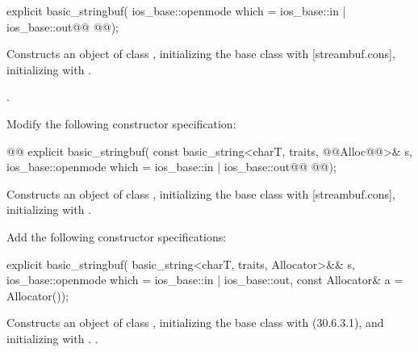 \documentclass[ebook,11pt,article]{memoir}
\renewcommand{\iref}[1]{[#1]}
\begin{document}
\begin{itemdecl}
explicit basic_stringbuf(
  ios_base::openmode which = ios_base::in | ios_base::out@\added{,}@
  @@);
\end{itemdecl}

\begin{itemdescr}
\pnum
\effects
Constructs an object of class
,
initializing the base class with
\iref{streambuf.cons},  initializing
with .

\pnum
\ensures
{}.
\end{itemdescr}

Modify the following constructor specification:
\begin{itemdecl}
@@
explicit basic_stringbuf(
  const basic_string<charT, traits, @@Alloc@@>& s,
  ios_base::openmode which = ios_base::in | ios_base::out@\added{,}@
  @@);
\end{itemdecl}

\begin{itemdescr}
\pnum
\effects
Constructs an object of class
,
initializing the base class with
\iref{streambuf.cons},  initializing
with .
\end{itemdescr}

Add the following constructor specifications:

\begin{insrt}
\begin{itemdecl}
explicit basic_stringbuf(
  basic_string<charT, traits, Allocator>&& s,
  ios_base::openmode which = ios_base::in | ios_base::out,
  const Allocator\& a = Allocator());
\end{itemdecl}
\begin{itemdescr}
\pnum
\effects Constructs an object of class , initializing the base class with  (30.6.3.1), and initializing  with . 
.
\end{itemdescr}
\end{insrt}
\end{document}
